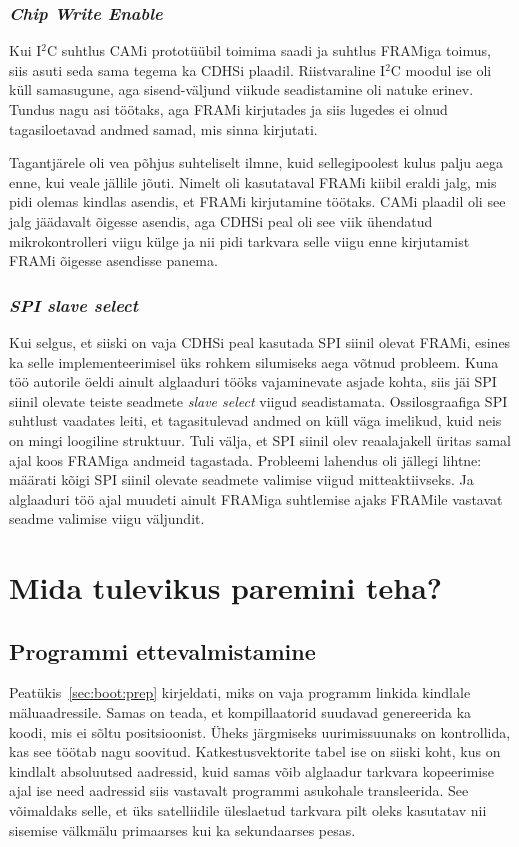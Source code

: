 \documentclass[12pt,a4paper]{article}
\newcommand{\iic}{I${}^2$C }
\begin{document}
\subsubsection{\textit{Chip Write Enable}}
Kui \iic suhtlus CAMi prototüübil toimima saadi ja suhtlus FRAMiga toimus, siis
asuti seda sama tegema ka CDHSi plaadil. Riistvaraline \iic moodul ise oli küll
samasugune, aga sisend-väljund viikude seadistamine oli natuke erinev. Tundus
nagu asi töötaks, aga FRAMi kirjutades ja siis lugedes ei olnud tagasiloetavad
andmed samad, mis sinna kirjutati.

Tagantjärele oli vea põhjus suhteliselt ilmne, kuid sellegipoolest kulus palju
aega enne, kui veale jällile jõuti. Nimelt oli kasutataval FRAMi kiibil eraldi
jalg, mis pidi olemas kindlas asendis, et FRAMi kirjutamine töötaks. CAMi
plaadil oli see jalg jäädavalt õigesse asendis, aga CDHSi peal oli see viik
ühendatud mikrokontrolleri viigu külge ja nii pidi tarkvara selle viigu enne
kirjutamist FRAMi õigesse asendisse panema.

\subsubsection{\textit{SPI slave select}}
Kui selgus, et siiski on vaja CDHSi peal kasutada SPI siinil olevat FRAMi,
esines ka selle implementeerimisel üks rohkem silumiseks aega võtnud probleem.
Kuna töö autorile öeldi ainult alglaaduri tööks vajaminevate asjade kohta, siis
jäi SPI siinil olevate teiste seadmete \textit{slave select} viigud
seadistamata. Ossilosgraafiga SPI suhtlust vaadates leiti, et tagasitulevad
andmed on küll väga imelikud, kuid neis on mingi loogiline struktuur. Tuli
välja, et SPI siinil olev reaalajakell üritas samal ajal koos FRAMiga andmeid
tagastada. Probleemi lahendus oli jällegi lihtne: määrati kõigi SPI siinil
olevate seadmete valimise viigud mitteaktiivseks. Ja alglaaduri töö ajal muudeti
ainult FRAMiga suhtlemise ajaks FRAMile vastavat seadme valimise viigu väljundit.

\section{Mida tulevikus paremini teha?}
\subsection{Programmi ettevalmistamine}
Peatükis~\ref{sec:boot:prep} kirjeldati, miks on vaja programm linkida kindlale
mäluaadressile. Samas on teada, et kompillaatorid suudavad genereerida ka koodi,
mis ei sõltu positsioonist. Üheks järgmiseks uurimissuunaks on kontrollida, kas
see töötab nagu soovitud. Katkestusvektorite tabel ise on siiski koht, kus on
kindlalt absoluutsed aadressid, kuid samas võib alglaadur tarkvara kopeerimise
ajal ise need aadressid siis vastavalt programmi asukohale transleerida. See
võimaldaks selle, et üks satelliidile üleslaetud tarkvara pilt oleks kasutatav
nii sisemise välkmälu primaarses kui ka sekundaarses pesas.
\end{document}
